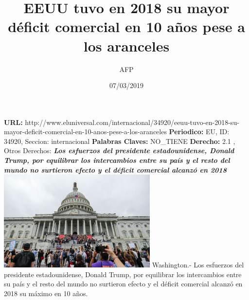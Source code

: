 \documentclass{article}%
\title{\textbf{EEUU tuvo en 2018 su mayor déficit comercial en 10 años pese a los aranceles}}%
\author{AFP}%
\date{07/03/2019}%
\begin{document}
%
\normalsize%
\maketitle%
\textbf{URL: }%
http://www.eluniversal.com/internacional/34920/eeuu{-}tuvo{-}en{-}2018{-}su{-}mayor{-}deficit{-}comercial{-}en{-}10{-}anos{-}pese{-}a{-}los{-}aranceles\newline%
%
\textbf{Periodico: }%
EU, %
ID: %
34920, %
Seccion: %
internacional\newline%
%
\textbf{Palabras Claves: }%
NO\_TIENE\newline%
%
\textbf{Derecho: }%
2.1%
, Otros Derechos: %
\newline%
%
\textbf{\textit{Los esfuerzos del presidente estadounidense, Donald Trump, por equilibrar los intercambios entre su país y el resto del mundo no surtieron efecto y el déficit comercial alcanzó en 2018}}%
\newline%
\newline%
%
\includegraphics[width=300px]{EU_34920.jpg}%
\newline%
%
Washington.{-} Los esfuerzos del presidente estadounidense, Donald Trump, por equilibrar los intercambios entre su país y el resto del mundo no surtieron efecto y el déficit comercial alcanzó en 2018 su máximo en 10 años.%
\newline%
%
\end{document}
